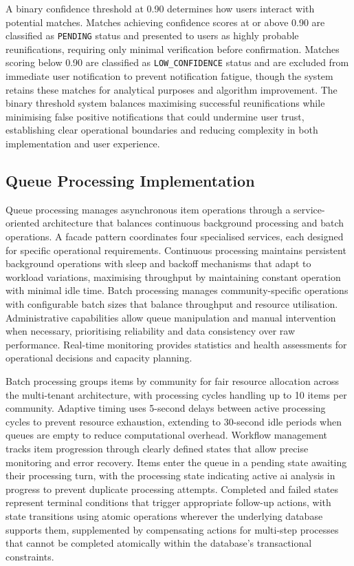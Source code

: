 A binary confidence threshold at 0.90 determines how users interact with potential matches. Matches achieving confidence scores at or above 0.90 are classified as \texttt{PENDING} status and presented to users as highly probable reunifications, requiring only minimal verification before confirmation. Matches scoring below 0.90 are classified as \texttt{LOW\_CONFIDENCE} status and are excluded from immediate user notification to prevent notification fatigue, though the system retains these matches for analytical purposes and algorithm improvement. The binary threshold system balances maximising successful reunifications while minimising false positive notifications that could undermine user trust, establishing clear operational boundaries and reducing complexity in both implementation and user experience.



\subsection{Queue Processing Implementation} \label{subsection:queue_processing}

Queue processing manages asynchronous item operations through a service-oriented architecture that balances continuous background processing and batch operations. A facade pattern coordinates four specialised services, each designed for specific operational requirements. Continuous processing maintains persistent background operations with sleep and backoff mechanisms that adapt to workload variations, maximising throughput by maintaining constant operation with minimal idle time. Batch processing manages community-specific operations with configurable batch sizes that balance throughput and resource utilisation. Administrative capabilities allow queue manipulation and manual intervention when necessary, prioritising reliability and data consistency over raw performance. Real-time monitoring provides statistics and health assessments for operational decisions and capacity planning.

Batch processing groups items by community for fair resource allocation across the multi-tenant architecture, with processing cycles handling up to 10 items per community. Adaptive timing uses 5-second delays between active processing cycles to prevent resource exhaustion, extending to 30-second idle periods when queues are empty to reduce computational overhead. Workflow management tracks item progression through clearly defined states that allow precise monitoring and error recovery. Items enter the queue in a pending state awaiting their processing turn, with the processing state indicating active \ac{ai} analysis in progress to prevent duplicate processing attempts. Completed and failed states represent terminal conditions that trigger appropriate follow-up actions, with state transitions using atomic operations wherever the underlying database supports them, supplemented by compensating actions for multi-step processes that cannot be completed atomically within the database's transactional constraints.

